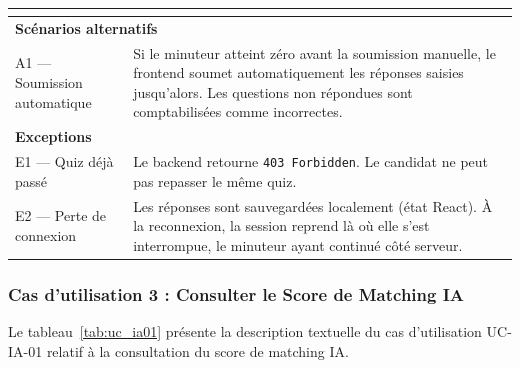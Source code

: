 \begin{longtable}{|p{4cm}|p{10cm}|}
{\vspace{2pt}
} \\ \hline
\multicolumn{2}{|l|}{\textbf{Scénarios alternatifs}} \\ \hline
A1 — Soumission automatique &
Si le minuteur atteint zéro avant la soumission manuelle, le frontend soumet automatiquement les réponses saisies jusqu'alors. Les questions non répondues sont comptabilisées comme incorrectes. \\ \hline
\multicolumn{2}{|l|}{\textbf{Exceptions}} \\ \hline
E1 — Quiz déjà passé & Le backend retourne \texttt{403 Forbidden}. Le candidat ne peut pas repasser le même quiz. \\ \hline
E2 — Perte de connexion & Les réponses sont sauvegardées localement (état React). À la reconnexion, la session reprend là où elle s'est interrompue, le minuteur ayant continué côté serveur. \\ \hline
\end{longtable}
\renewcommand{\arraystretch}{1}

\subsubsection{Cas d'utilisation 3 : Consulter le Score de Matching IA}

Le tableau~\ref{tab:uc_ia01} présente la description textuelle du cas d'utilisation UC-IA-01 relatif à la consultation du score de matching IA.


